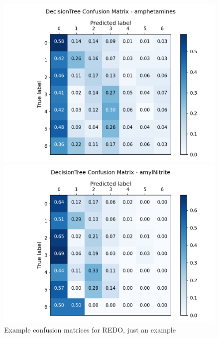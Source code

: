 \documentclass{article}
\begin{document}
\begin{figure}[h!]
	\centering
	\begin{minipage}[b]{0.49\textwidth}
		\includegraphics[width=\textwidth]{Plots/m2.png}

	\end{minipage}
	\begin{minipage}[b]{0.49\textwidth}
		\includegraphics[width=\textwidth]{Plots/m1.png}

	\end{minipage}

	\caption{Example confusion matrices for {\color{red} REDO, just an example }  }
	\label{confusion_matrices}
\end{figure}
\end{document}
